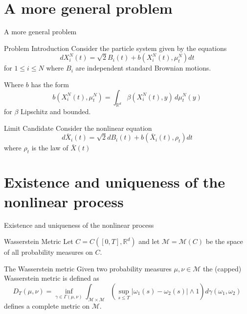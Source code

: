 \documentclass{beamer}
\newcommand{\sectionstart}[1]{
    \section{#1}
    \begin{frame}
        \centering
        \huge{#1}
    \end{frame}
}
\newcommand{\R}{\mathbb{R}}
\begin{document}
    \sectionstart{A more general problem}

    \begin{frame}{Problem Introduction}
        Consider the particle system given by the equations
        \begin{equation*}
            dX_i^N(t) =  \sqrt2B_i(t) + b(X_i^N(t),\mu_t^N)dt
        \end{equation*}
        for $1\leq i\leq N$ where $B_i$ are independent standard Brownian 
        motions.

        \pause
        \medskip

        Where $b$ has the form
        \begin{equation*}
            b(X_i^N(t),\mu_t^N) = \int_{\R^d}\beta(X_i^N(t),y)\,d\mu_t^N(y)
        \end{equation*}
        for $\beta$ Lipschitz and bounded.
    \end{frame}

    \begin{frame}{Limit Candidate}
        Consider the nonlinear equation
        \begin{equation*}
            d\bar X_i(t) = \sqrt 2 dB_i(t) + b(\bar X_i(t),\rho_t)dt
        \end{equation*}
        where $\rho_t$ is the law of $\bar X(t)$
    \end{frame}

    \sectionstart{Existence and uniqueness of the nonlinear process}

    \begin{frame}{Wasserstein Metric}
        Let $C = C([0,T],\R^d)$ and let $\mathcal{M} = \mathcal{M}(C)$
        be the space of all probability measures on $C$.

        \pause
        \medskip
    
        \begin{block}{The Wasserstein metric}
            Given two probability measures $\mu,\nu\in \mathcal{M}$
            the (capped) Wasserstein metric
            is defined as
            \begin{equation*}
                D_T(\mu,\nu)
                = \inf_{\gamma\in\Gamma(\mu,\nu)}\int_{\mathcal{M}\times\mathcal{M}}
                \left(\sup_{s\leq T}\vert\omega_1(s)-\omega_2(s)\vert \wedge 1\right)
                d\gamma(\omega_1,\omega_2)
            \end{equation*}
            defines a complete metric on $\mathcal{M}$.
        \end{block}
    \end{frame}
\end{document}
